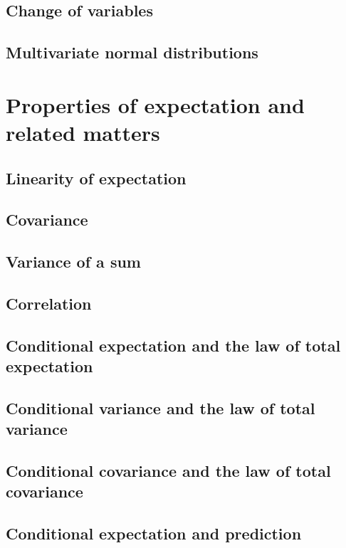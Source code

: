\documentclass[11pt]{article}
\theoremstyle{definition}
\theoremstyle{plain}
\theoremstyle{remark}
\begin{document}
\subsection{Change of variables}

\subsection{Multivariate normal distributions}

\section{Properties of expectation and related matters}

\subsection{Linearity of expectation}

\subsection{Covariance}

\subsection{Variance of a sum}

\subsection{Correlation}

\subsection{Conditional expectation and the law of total expectation}

\subsection{Conditional variance and the law of total variance}

\subsection{Conditional covariance and the law of total covariance}

\subsection{Conditional expectation and prediction}
\end{document}
